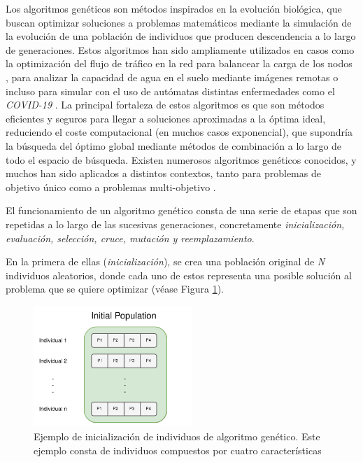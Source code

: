 Los algoritmos genéticos son métodos inspirados en la evolución biológica, que buscan optimizar soluciones a problemas matemáticos mediante la simulación de la evolución de una población de individuos que producen descendencia a lo largo de generaciones. Estos algoritmos han sido ampliamente utilizados en casos como la optimización del flujo de tráfico en la red para balancear la carga de los nodos \cite{5483775}, para analizar la capacidad de agua en el suelo mediante imágenes remotas \cite{PACHEPSKY1998213} o incluso para simular con el uso de autómatas distintas enfermedades como el \textit{COVID-19} \cite{GHOSH2020106692}. La principal fortaleza de estos algoritmos es que son métodos eficientes y seguros para llegar a soluciones aproximadas a la óptima ideal, reduciendo el coste computacional (en muchos casos exponencial), que supondría la búsqueda del óptimo global mediante métodos de combinación a lo largo de todo el espacio de búsqueda. Existen numerosos algoritmos genéticos conocidos, y muchos han sido aplicados a distintos contextos, tanto para problemas de objetivo único como a problemas multi-objetivo \cite{wang2020comparative}.

El funcionamiento de un algoritmo genético consta de una serie de etapas que son repetidas a lo largo de las sucesivas generaciones, concretamente \textit{inicialización, evaluación, selección, cruce, mutación y reemplazamiento}.

En la primera de ellas (\textit{inicialización}), se crea una población original de \textit{N} individuos aleatorios, donde cada uno de estos representa una posible solución al problema que se quiere optimizar (véase Figura \ref{GA_inicializacion}).

\begin{figure}[H]
	\centering
	\includegraphics[width=6cm]{Figures/GA/inicializacion.png}
	\caption[Ejemplo de inicialización de individuos de algoritmo genético] {Ejemplo de inicialización de individuos de algoritmo genético. Este ejemplo consta de individuos compuestos por cuatro características}
	\label{GA_inicializacion}
\end{figure}


